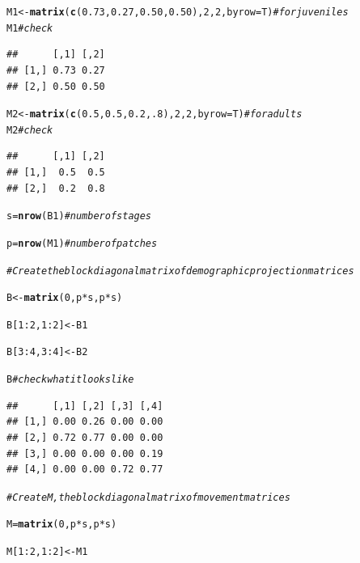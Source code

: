 \documentclass{article}\usepackage[]{graphicx}\usepackage[]{color}
\makeatletter
\newcommand{\hlnum}[1]{\textcolor[rgb]{0.686,0.059,0.569}{#1}}%
\newcommand{\hlcom}[1]{\textcolor[rgb]{0.678,0.584,0.686}{\textit{#1}}}%
\newcommand{\hlopt}[1]{\textcolor[rgb]{0,0,0}{#1}}%
\newcommand{\hlstd}[1]{\textcolor[rgb]{0.345,0.345,0.345}{#1}}%
\newcommand{\hlkwb}[1]{\textcolor[rgb]{0.69,0.353,0.396}{#1}}%
\newcommand{\hlkwc}[1]{\textcolor[rgb]{0.333,0.667,0.333}{#1}}%
\newcommand{\hlkwd}[1]{\textcolor[rgb]{0.737,0.353,0.396}{\textbf{#1}}}%
\newenvironment{kframe}{%
 \def\at@end@of@kframe{}%
 \ifinner\ifhmode%
  \def\at@end@of@kframe{\end{minipage}}%
  \begin{minipage}{\columnwidth}%
 \fi\fi%
 \def\FrameCommand##1{\hskip\@totalleftmargin \hskip-\fboxsep
 \colorbox{shadecolor}{##1}\hskip-\fboxsep
     \hskip-\linewidth \hskip-\@totalleftmargin \hskip\columnwidth}%
 \MakeFramed {\advance\hsize-\width
   \@totalleftmargin\z@ \linewidth\hsize
   \@setminipage}}%
 {\par\unskip\endMakeFramed%
 \at@end@of@kframe}
\newenvironment{knitrout}{}{} %
\makeatother
\begin{document}
\begin{knitrout}
\begin{kframe}
\begin{alltt}
\hlstd{M1}\hlkwb{<-}\hlkwd{matrix}\hlstd{(}\hlkwd{c}\hlstd{(}\hlnum{0.73}\hlstd{,}\hlnum{0.27}\hlstd{,}\hlnum{0.50}\hlstd{,}\hlnum{0.50}\hlstd{),}\hlnum{2}\hlstd{,}\hlnum{2}\hlstd{,}\hlkwc{byrow}\hlstd{=T)}  \hlcom{# for juveniles}
\hlstd{M1} \hlcom{#check}
\end{alltt}
\begin{verbatim}
##      [,1] [,2]
## [1,] 0.73 0.27
## [2,] 0.50 0.50
\end{verbatim}
\begin{alltt}
\hlstd{M2}\hlkwb{<-}\hlkwd{matrix}\hlstd{(}\hlkwd{c}\hlstd{(}\hlnum{0.5}\hlstd{,}\hlnum{0.5}\hlstd{,}\hlnum{0.2}\hlstd{,}\hlnum{.8}\hlstd{),}\hlnum{2}\hlstd{,}\hlnum{2}\hlstd{,}\hlkwc{byrow}\hlstd{=T)} \hlcom{# for adults}
\hlstd{M2} \hlcom{#check}
\end{alltt}
\begin{verbatim}
##      [,1] [,2]
## [1,]  0.5  0.5
## [2,]  0.2  0.8
\end{verbatim}
\begin{alltt}
\hlstd{s}\hlkwb{=}\hlkwd{nrow}\hlstd{(B1)} \hlcom{# number of stages}

\hlstd{p}\hlkwb{=}\hlkwd{nrow}\hlstd{(M1)} \hlcom{# number of patches}


\hlcom{# Create the block diagonal matrix of demographic projection matrices}

\hlstd{B}\hlkwb{<-}\hlkwd{matrix}\hlstd{(}\hlnum{0}\hlstd{,p}\hlopt{*}\hlstd{s,p}\hlopt{*}\hlstd{s)}

\hlstd{B[}\hlnum{1}\hlopt{:}\hlnum{2}\hlstd{,}\hlnum{1}\hlopt{:}\hlnum{2}\hlstd{]}\hlkwb{<-}\hlstd{B1}

\hlstd{B[}\hlnum{3}\hlopt{:}\hlnum{4}\hlstd{,}\hlnum{3}\hlopt{:}\hlnum{4}\hlstd{]}\hlkwb{<-}\hlstd{B2}

\hlstd{B} \hlcom{#check what it looks like}
\end{alltt}
\begin{verbatim}
##      [,1] [,2] [,3] [,4]
## [1,] 0.00 0.26 0.00 0.00
## [2,] 0.72 0.77 0.00 0.00
## [3,] 0.00 0.00 0.00 0.19
## [4,] 0.00 0.00 0.72 0.77
\end{verbatim}
\begin{alltt}
\hlcom{# Create M, the block diagonal matrix of movement matrices}

\hlstd{M}\hlkwb{=}\hlkwd{matrix}\hlstd{(}\hlnum{0}\hlstd{,p}\hlopt{*}\hlstd{s,p}\hlopt{*}\hlstd{s)}

\hlstd{M[}\hlnum{1}\hlopt{:}\hlnum{2}\hlstd{,}\hlnum{1}\hlopt{:}\hlnum{2}\hlstd{]}\hlkwb{<-}\hlstd{M1}


\end{alltt}
\end{kframe}
\end{knitrout}
\end{document}
